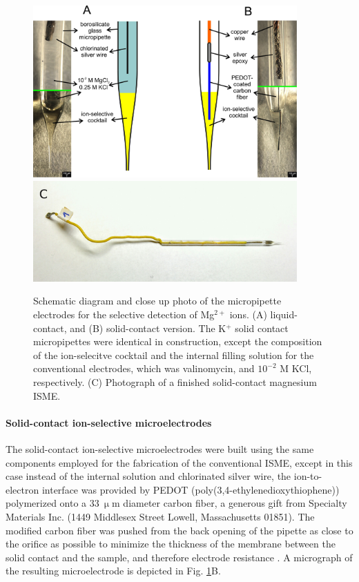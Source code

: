 \begin{figure}
\centering
\includegraphics[width=0.9\textwidth]{img/liquid_solid.jpg}
\includegraphics[width=0.9\textwidth]{img/mg_top.jpg}
\caption[Schematic diagram and close up photo of the micropipette electrodes for the selective detection of Mg$^{2+}$ ions.]{Schematic diagram and close up photo of the micropipette electrodes for the selective detection of Mg$^{2+}$ ions. (A) liquid-contact, and (B) solid-contact version.
The K$^+$ solid contact micropipettes were identical in construction, except the composition of the ion-selecitve cocktail and the internal filling solution for the conventional electrodes, which was valinomycin, and $10^{-2}$ M KCl, respectively. (C) Photograph of a finished solid-contact magnesium ISME.}
\label{fig:solid_liquid}
\end{figure}

				\paragraph{Solid-contact ion-selective microelectrodes}
The solid-contact ion-selective microelectrodes were built using the same components employed for the fabrication of the conventional ISME, except in this case instead of the internal solution and chlorinated silver wire, the ion-to-electron interface was provided by PEDOT (poly(3,4-ethylenedioxythiophene)) polymerized onto a $33~\upmu$m diameter carbon fiber, a generous gift from Specialty Materials Inc. (1449 Middlesex Street Lowell, Massachusetts 01851).
The modified carbon fiber was pushed from the back opening of the pipette as close to the orifice as possible to minimize the thickness of the membrane between the solid contact and the sample, and therefore electrode resistance \cite{gyetvai2007solid}.
A micrograph of the resulting microelectrode is depicted in Fig. \ref{fig:solid_liquid}B.
